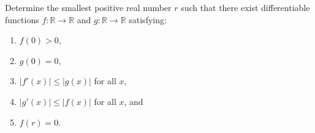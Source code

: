 \begin{problem}[D][9][Putnam 2023 /A3]
     Determine the smallest positive real number $r$ such that there exist differentiable functions $f : \mathbb{R} \to \mathbb{R}$ and $g : \mathbb{R} \to \mathbb{R}$ satisfying:
    \begin{enumerate}
        \item $f(0) > 0$,
        \item $g(0) = 0$,
        \item $|f'(x)| \leq |g(x)|$ for all $x$,
        \item $|g'(x)| \leq |f(x)|$ for all $x$, and
        \item $f(r) = 0$.
    \end{enumerate}
\end{problem}

